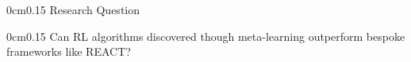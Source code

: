 
\begingroup
	\begin{frame}
        \vspace{2cm}
        \begin{adjustwidth}{0cm}{0.15\textwidth}
            {\Huge{\ImperialSansSemiBold Research Question}}
        \end{adjustwidth}
		\begin{adjustwidth}{0cm}{0.15\textwidth}
			{\Large{\ImperialSansSemiBold Can RL algorithms discovered though meta-learning outperform bespoke frameworks like REACT?}}
		\end{adjustwidth}
	\end{frame}
\endgroup
